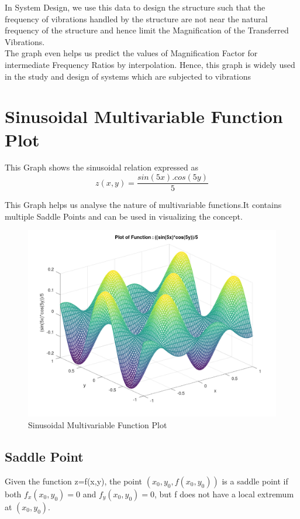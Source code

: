 \documentclass{article}
\begin{document}
In System Design, we use this data to design the structure such that the frequency of vibrations handled by the structure are not near the natural frequency of the structure and hence limit the Magnification of the Transferred Vibrations.\\ 

The graph even helps us predict the values of Magnification Factor for intermediate Frequency Ratios by interpolation. Hence, this graph is widely used in the study and design of systems which are subjected to vibrations
\pagebreak


\section{Sinusoidal Multivariable Function Plot}
This Graph shows the sinusoidal relation expressed as
\[z(x,y) = \frac{sin(5x).cos(5y)}{5}\]

This Graph helps us analyse the nature of multivariable functions.It contains multiple Saddle Points and can be used in visualizing the concept.\\

\begin{figure} [!ht] %
\centering
\includegraphics[scale=0.3]{Octave_3D Plot.png}
\caption{Sinusoidal Multivariable Function Plot}
\label{fig2.}
\end{figure}


\subsection{Saddle Point}
Given the function z=f(x,y), the point $(x_{0},y_{0},f(x_{0},y_{0}))$ is a saddle point if both $f_{x}(x_{0},y_{0})=0$ and $f_{y}(x_{0},y_{0})=0$, but f does not have a local extremum at $(x_{0},y_{0})$.\\
\end{document}
